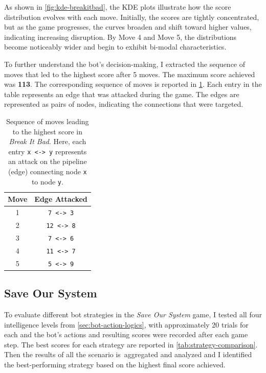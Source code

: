 \documentclass[12pt,a4paper]{article}
\begin{document}
        As shown in \cref{fig:kde-breakitbad}, the KDE plots illustrate how the score distribution evolves with each move. Initially, the scores are tightly concentrated, but as the game progresses, the curves broaden and shift toward higher values, indicating increasing disruption. By Move 4 and Move 5, the distributions become noticeably wider and begin to exhibit bi-modal characteristics.

        To further understand the bot's decision-making, I extracted the sequence of moves that led to the highest score after 5 moves. The maximum score achieved was \textbf{113}. The corresponding sequence of moves is reported in \cref{tab:breakitbad-moves}. Each entry in the table represents an edge that was attacked during the game. The edges are represented as pairs of nodes, indicating the connections that were targeted.

        \begin{table}[h!]
            \centering
            \begin{tabular}{cc}
            \toprule
            \textbf{Move} & \textbf{Edge Attacked} \\
            \midrule
            1 & \texttt{7 <-> 3} \\
            2 & \texttt{12 <-> 8} \\
            3 & \texttt{7 <-> 6} \\
            4 & \texttt{11 <-> 7} \\
            5 & \texttt{5 <-> 9} \\
            \bottomrule
            \end{tabular}
            \caption{Sequence of moves leading to the highest score in \textit{Break It Bad}. Here, each entry \texttt{x <-> y} represents an attack on the pipeline (edge) connecting node \texttt{x} to node \texttt{y}.}
            \label{tab:breakitbad-moves}
        \end{table}

        \subsection{Save Our System}
        To evaluate different bot strategies in the \textit{Save Our System} game, I tested all four intelligence levels from \cref{sec:bot-action-logics}, with approximately 20 trials for each and the bot’s actions and resulting scores were recorded after each game step. The best scores for each strategy are reported in \cref{tab:strategy-comparison}. Then the results of all the scenario is aggregated and analyzed and I identified the best-performing strategy based on the highest final score achieved.
\end{document}
